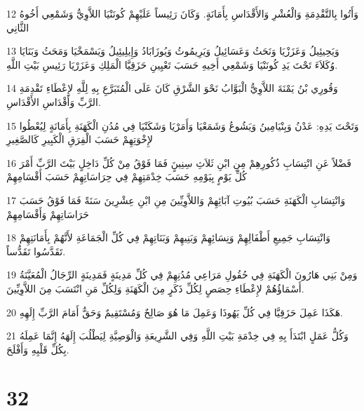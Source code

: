 \par 12 وَأَتُوا بِالتَّقْدِمَةِ وَالْعُشْرِ وَالأَقْدَاسِ بِأَمَانَةٍ. وَكَانَ رَئِيساً عَلَيْهِمْ كُونَنْيَا اللاَّوِيُّ وَشَمْعِي أَخُوهُ الثَّانِي
\par 13 وَيَحِيئِيلُ وَعَزَزْيَا وَنَحَثُ وَعَسَائِيلُ وَيَرِيمُوثُ وَيُوزَابَادُ وَإِيلِيئِيلُ وَيَسْمَخْيَا وَمَحَثُ وَبَنَايَا وُكَلاَءَ تَحْتَ يَدِ كُونَنْيَا وَشَمْعِي أَخِيهِ حَسَبَ تَعْيِينِ حَزَقِيَّا الْمَلِكِ وَعَزَرْيَا رَئِيسِ بَيْتِ اللَّهِ.
\par 14 وَقُورِي بْنُ يَمْنَةَ اللاَّوِيُّ الْبَوَّابُ نَحْوَ الشَّرْقِ كَانَ عَلَى الْمُتَبَرَّعِ بِهِ لِلَّهِ لإِعْطَاءِ تَقْدِمَةِ الرَّبِّ وَأَقْدَاسِ الأَقْدَاسِ.
\par 15 وَتَحْتَ يَدِهِ: عَدْنُ وَبِنْيَامِينُ وَيَشُوعُ وَشَمَعْيَا وَأَمَرْيَا وَشَكَنْيَا فِي مُدُنِ الْكَهَنَةِ بِأَمَانَةٍ لِيُعْطُوا لإِخْوَتِهِمْ حَسَبَ الْفِرَقِ الْكَبِيرِ كَالصَّغِيرِ
\par 16 فَضْلاً عَنِ انْتِسَابِ ذُكُورِهِمْ مِنِ ابْنِ ثَلاَثِ سِنِينٍَ فَمَا فَوْقُ مِنْ كُلِّ دَاخِلٍ بَيْتَ الرَّبِّ أَمْرَ كُلِّ يَوْمٍ بِيَوْمِهِ حَسَبَ خِدْمَتِهِمْ فِي حِرَاسَاتِهِمْ حَسَبَ أَقْسَامِهِمْ
\par 17 وَانْتِسَابِ الْكَهَنَةِ حَسَبَ بُيُوتِ آبَائِهِمْ وَاللاَّوِيِّينَ مِنِ ابْنِ عِشْرِينَ سَنَةً فَمَا فَوْقُ حَسَبَ حَرَاسَاتِهِمْ وَأَقْسَامِهِمْ
\par 18 وَانْتِسَابِ جَمِيعِ أَطْفَالِهِمْ وَنِسَائِهِمْ وَبَنِيهِمْ وَبَنَاتِهِمْ فِي كُلِّ الْجَمَاعَةِ لأَنَّهُمْ بِأَمَانَتِهِمْ تَقَدَّسُوا تَقَدُّساً.
\par 19 وَمِنْ بَنِي هَارُونَ الْكَهَنَةِ فِي حُقُولِ مَرَاعِي مُدُنِهِمْ فِي كُلِّ مَدِينَةٍ فَمَدِينَةٍ الرِّجَالُ الْمُعَيَّنَةُ أَسْمَاؤُهُمْ لإِعْطَاءِ حِصَصٍ لِكُلِّ ذَكَرٍ مِنَ الْكَهَنَةِ وَلِكُلِّ مَنِ انْتَسَبَ مِنَ اللاَّوِيِّينَ.
\par 20 هَكَذَا عَمِلَ حَزَقِيَّا فِي كُلِّ يَهُوذَا وَعَمِلَ مَا هُوَ صَالِحٌ وَمُسْتَقِيمٌ وَحَقٌّ أَمَامَ الرَّبِّ إِلَهِهِ.
\par 21 وَكُلُّ عَمَلٍ ابْتَدَأَ بِهِ فِي خِدْمَةِ بَيْتِ اللَّهِ وَفِي الشَّرِيعَةِ وَالْوَصِيَّةِ لِيَطْلُبَ إِلَهَهُ إِنَّمَا عَمِلَهُ بِكُلِّ قَلْبِهِ وَأَفْلَحَ.

\chapter{32}

